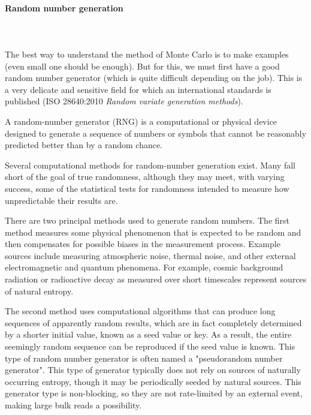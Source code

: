 	\pagebreak
	\paragraph{Random number generation}\mbox{}\\\\
	The best way to understand the method of Monte Carlo is to make examples (even small one should be enough). But for this, we must first have a good random number generator (which is quite difficult depending on the job). This is a very delicate and sensitive field for which an international standards is published (ISO 28640:2010 \textit{Random variate generation methods}).
	
	A random-number generator (RNG) is a computational or physical device designed to generate a sequence of numbers or symbols that cannot be reasonably predicted better than by a random chance.
	
	Several computational methods for random-number generation exist. Many fall short of the goal of true randomness, although they may meet, with varying success, some of the statistical tests for randomness intended to measure how unpredictable their results are.
	
	There are two principal methods used to generate random numbers. The first method measures some physical phenomenon that is expected to be random and then compensates for possible biases in the measurement process. Example sources include measuring atmospheric noise, thermal noise, and other external electromagnetic and quantum phenomena. For example, cosmic background radiation or radioactive decay as measured over short timescales represent sources of natural entropy.
	
	The second method uses computational algorithms that can produce long sequences of apparently random results, which are in fact completely determined by a shorter initial value, known as a seed value or key. As a result, the entire seemingly random sequence can be reproduced if the seed value is known. This type of random number generator is often named a "pseudorandom number generator". This type of generator typically does not rely on sources of naturally occurring entropy, though it may be periodically seeded by natural sources. This generator type is non-blocking, so they are not rate-limited by an external event, making large bulk reads a possibility.
	
